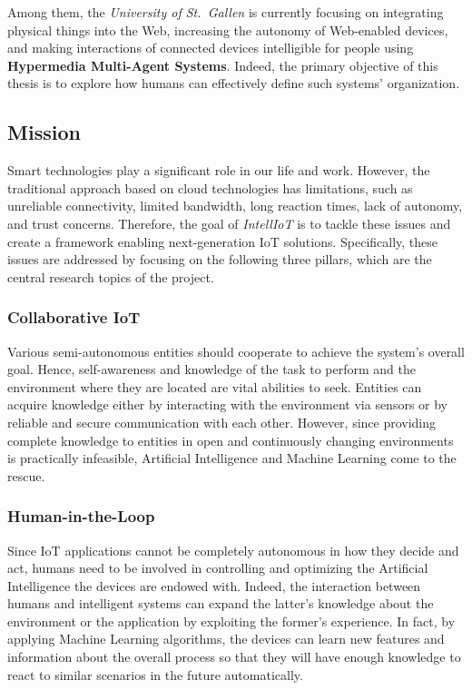 Among them, the \textit{University of St.\ Gallen} is currently focusing on integrating physical things into the Web, increasing the autonomy of Web-enabled devices, and making interactions of connected devices intelligible for people using \textbf{Hypermedia Multi-Agent Systems}.
Indeed, the primary objective of this thesis is to explore how humans can effectively define such systems' organization.

\subsection{Mission}
Smart technologies play a significant role in our life and work.
However, the traditional approach based on cloud technologies has limitations, such as unreliable connectivity, limited bandwidth, long reaction times, lack of autonomy, and trust concerns.
Therefore, the goal of \textit{IntellIoT} is to tackle these issues and create a framework enabling next-generation IoT solutions. Specifically, these issues are addressed by focusing on the following three pillars, which are the central research topics of the project.

\subsubsection{Collaborative IoT}
Various semi-autonomous entities should cooperate to achieve the system's overall goal.
Hence, self-awareness and knowledge of the task to perform and the environment where they are located are vital abilities to seek.
Entities can acquire knowledge either by interacting with the environment via sensors or by reliable and secure communication with each other.
However, since providing complete knowledge to entities in open and continuously changing environments is practically infeasible, Artificial Intelligence and Machine Learning come to the rescue.

\subsubsection{Human-in-the-Loop}
Since IoT applications cannot be completely autonomous in how they decide and act, humans need to be involved in controlling and optimizing the Artificial Intelligence the devices are endowed with.
Indeed, the interaction between humans and intelligent systems can expand the latter's knowledge about the environment or the application by exploiting the former's experience.
In fact, by applying Machine Learning algorithms, the devices can learn new features and information about the overall process so that they will have enough knowledge to react to similar scenarios in the future automatically.

